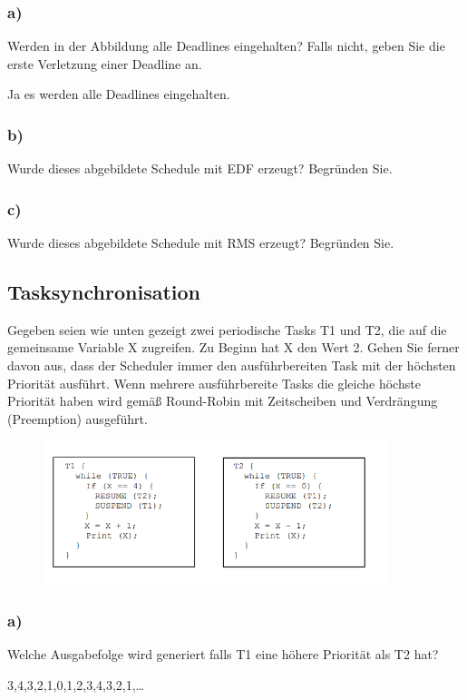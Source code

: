 \subsubsection{a)}
Werden in der Abbildung alle Deadlines eingehalten? Falls nicht, geben Sie die erste Verletzung
einer Deadline an.

Ja es werden alle Deadlines eingehalten.

\subsubsection{b)}
Wurde dieses abgebildete Schedule mit EDF erzeugt? Begründen Sie.

\subsubsection{c)}
Wurde dieses abgebildete Schedule mit RMS erzeugt? Begründen Sie.

\subsection{Tasksynchronisation}
Gegeben seien wie unten gezeigt zwei periodische Tasks T1 und T2, die auf die gemeinsame Variable X
zugreifen. Zu Beginn hat X den Wert 2. Gehen Sie ferner davon aus, dass der Scheduler immer den
ausführbereiten Task mit der höchsten Priorität ausführt. Wenn mehrere ausführbereite Tasks die gleiche
höchste Priorität haben wird gemäß Round-Robin mit Zeitscheiben und Verdrängung (Preemption)
ausgeführt.

\begin{figure}[H]
  \includegraphics[width=10cm]{images/KA140421/4a.PNG}
  \centering
\end{figure}

\subsubsection{a)}
Welche Ausgabefolge wird generiert falls T1 eine höhere Priorität als T2 hat?

3,4,3,2,1,0,1,2,3,4,3,2,1,\dots

